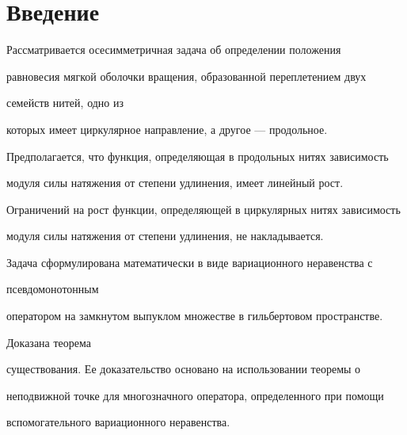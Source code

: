 \date{}




\pagestyle{plain} %







\maketitle


\label{begin}








\section{Введение}





Рассматривается осесимметричная задача об определении положения


равновесия мягкой оболочки вращения, образованной переплетением двух


семейств нитей, одно из


которых имеет циркулярное направление, а другое --- продольное.


Предполагается, что функция, определяющая в продольных нитях зависимость


модуля силы натяжения от степени удлинения, имеет линейный рост.


Ограничений на рост функции, определяющей в циркулярных нитях зависимость


модуля силы натяжения от степени удлинения, не накладывается.


Задача сформулирована математически в виде вариационного неравенства с


псевдомонотонным


оператором на замк\-нутом выпуклом множестве в гильбертовом пространстве.


Доказана теорема


существования. Ее доказательство основано на использовании теоремы о


неподвижной точке для многозначного оператора, определенного при помощи


вспомогательного вариационного неравенства.





